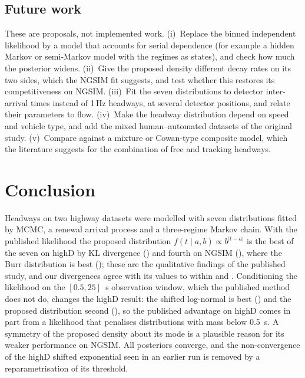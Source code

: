 \documentclass[11pt,a4paper]{article}
\numberwithin{equation}{section}
\begin{document}
\subsection{Future work}
These are proposals, not implemented work. (i)~Replace the binned independent likelihood by a model that accounts for serial dependence (for example a hidden Markov or semi-Markov model with the regimes as states), and check how much the posterior widens.
(ii)~Give the proposed density different decay rates on its two sides, which the NGSIM fit suggests, and test whether this restores its competitiveness on NGSIM.
(iii)~Fit the seven distributions to detector inter-arrival times instead of 1\,Hz headways, at several detector positions, and relate their parameters to flow.
(iv)~Make the headway distribution depend on speed and vehicle type, and add the mixed human--automated datasets of the original study.
(v)~Compare against a mixture or Cowan-type composite model, which the literature suggests for the combination of free and tracking headways.

\section{Conclusion}\label{sec:conclusion}
Headways on two highway datasets were modelled with seven distributions fitted by MCMC, a renewal arrival process and a three-regime Markov chain. With the published likelihood the proposed distribution $f(t\mid a,b)\propto b^{|t-a|}$ is the best of the seven on highD by KL divergence (\hdKLPropPaper) and fourth on NGSIM (\ngKLProp), where the Burr distribution is best (\ngKLBurr);
these are the qualitative findings of the published study, and our divergences agree with its values to within \hdKLMaxDiffPaper{} and \ngKLMaxDiffPaper. Conditioning the likelihood on the $[0.5,25]$~s observation window, which the published method does not do, changes the highD result: the shifted log-normal is best (\hdKLSLN) and the proposed distribution second (\hdKLProp),
so the published advantage on highD comes in part from a likelihood that penalises distributions with mass below 0.5~s. A symmetry of the proposed density about its mode is a plausible reason for its weaker performance on NGSIM.
All posteriors converge, and the non-convergence of the highD shifted exponential seen in an earlier run is removed by a reparametrisation of its threshold.
\end{document}

